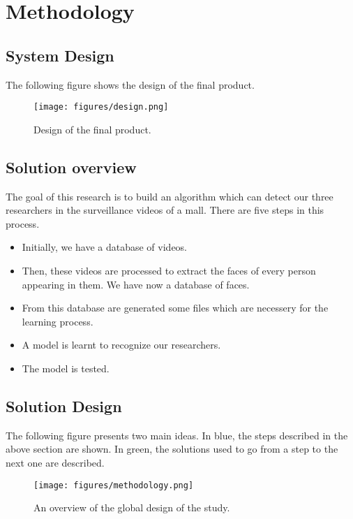 \setlength{\footskip}{8mm}

\chapter{Methodology}
\label{ch:methodology}

\section{System Design}
The following figure shows the design of the final product. 
\begin{figure}[!ht]
  \centering
  \texttt{[image: figures/design.png]}  
  \caption[Design of the final product.]{Design of the final product.}
  \label{fig:Design}
\end{figure}
\FloatBarrier

\section{Solution overview}

The goal of this research is to build an algorithm which can detect our three researchers in the surveillance videos of a mall. There are five steps in this process.
\begin{itemize}
\item Initially, we have a database of videos.\newline
\item Then, these videos are processed to extract the faces of every person appearing in them. We have now a database of faces.\newline
\item From this database are generated some files which are necessery for the learning process.\newline
\item A model is learnt to recognize our researchers.\newline
\item The model is tested.
\end{itemize}

\section{Solution Design}

The following figure presents two main ideas. In blue, the steps described in the above section are shown. In green, the solutions used to go from a step to the next one are described.\newline
\begin{figure}[!ht]
  \centering
  \texttt{[image: figures/methodology.png]}  
  \caption[An overview of the global design of the study.]{An overview of the global design of the study.}
  \label{fig:Methodology}
\end{figure}
\FloatBarrier

